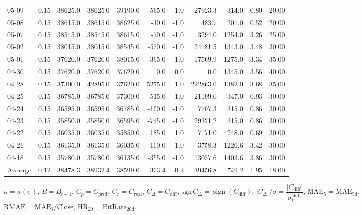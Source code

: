 \begin{threeparttable}
{\begin{tabular}{lrrrrrrrrrr}
05-09 & 0.15 & 38625.0 & 38625.0 & 39190.0 & -565.0 & -1.0 & 27923.3 & 314.0 & 0.80 & 20.00 \\
05-08 & 0.15 & 38615.0 & 38615.0 & 38625.0 & -10.0 & -1.0 & 483.7 & 201.0 & 0.52 & 20.00 \\
05-07 & 0.15 & 38545.0 & 38545.0 & 38615.0 & -70.0 & -1.0 & 3294.0 & 1254.0 & 3.26 & 25.00 \\
05-02 & 0.15 & 38015.0 & 38015.0 & 38545.0 & -530.0 & -1.0 & 24181.5 & 1343.0 & 3.48 & 30.00 \\
05-01 & 0.15 & 37620.0 & 37620.0 & 38015.0 & -395.0 & -1.0 & 17569.9 & 1275.0 & 3.34 & 35.00 \\
04-30 & 0.15 & 37620.0 & 37620.0 & 37620.0 & 0.0 & 0.0 & 0.0 & 1345.0 & 3.56 & 40.00 \\
04-28 & 0.15 & 37300.0 & 42895.0 & 37620.0 & 5275.0 & 1.0 & 222863.6 & 1382.0 & 3.68 & 35.00 \\
04-25 & 0.15 & 36785.0 & 36785.0 & 37300.0 & -515.0 & -1.0 & 21109.0 & 347.0 & 0.93 & 30.00 \\
04-24 & 0.15 & 36595.0 & 36595.0 & 36785.0 & -190.0 & -1.0 & 7707.3 & 315.0 & 0.86 & 30.00 \\
04-23 & 0.15 & 35850.0 & 35850.0 & 36595.0 & -745.0 & -1.0 & 29321.2 & 315.0 & 0.86 & 30.00 \\
04-22 & 0.15 & 36035.0 & 36035.0 & 35850.0 & 185.0 & 1.0 & 7171.0 & 248.0 & 0.69 & 30.00 \\
04-21 & 0.15 & 36135.0 & 36135.0 & 36035.0 & 100.0 & 1.0 & 3758.3 & 1226.6 & 3.42 & 30.00 \\
04-18 & 0.15 & 35780.0 & 35780.0 & 36135.0 & -355.0 & -1.0 & 13037.6 & 1403.6 & 3.86 & 30.00 \\
Average & 0.12 & 38478.3 & 38932.4 & 38599.0 & 333.4 & -0.2 & 39456.8 & 749.2 & 1.95 & 18.00 \\
\bottomrule
\end{tabular}
}%
\begin{tablenotes}\footnotesize
\item $\kappa=\kappa(\sigma)$, $B=B_{t-1}$, $C_p=C_{\text{pred}}$, $C_r=C_{\text{real}}$, $C_\Delta=C_{\text{diff}}$, $\mathrm{sgn}\,C_\Delta=\operatorname{sign}(C_{\text{diff}})$, $|C_\Delta|/\sigma=\dfrac{|C_{\text{diff}}|}{\sigma_t^{\text{shift}}}$, $\mathrm{MAE}_5=\mathrm{MAE}_{5\text{d}}$, $\mathrm{RMAE}= \mathrm{MAE}_5 / \text{Close}$, $\mathrm{HR}_{20}=\mathrm{HitRate}_{20\text{d}}$.
\end{tablenotes}
\end{threeparttable}
\endgroup